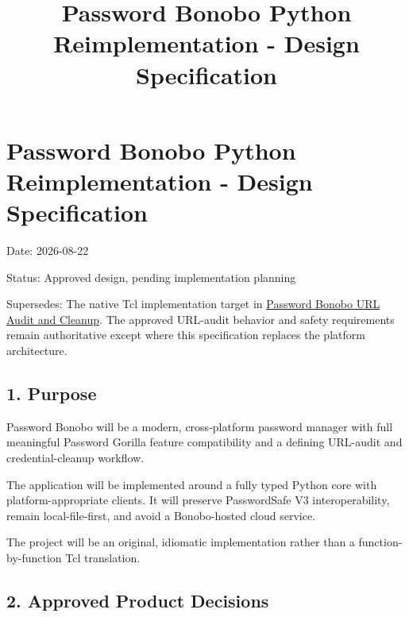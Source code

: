 \documentclass[
  letterpaper,
]{article}
\title{Password Bonobo Python Reimplementation - Design Specification}
\author{}
\date{}
\begin{document}
\maketitle

{
\setcounter{tocdepth}{3}
\tableofcontents
}
\section{Password Bonobo Python Reimplementation - Design
Specification}\label{password-bonobo-python-reimplementation---design-specification}

Date: 2026-08-22

Status: Approved design, pending implementation planning

Supersedes: The native Tcl implementation target in \href{./password-bonobo-url-audit-design.md}{Password Bonobo URL
Audit and Cleanup}. The approved URL-audit behavior and safety requirements remain authoritative except where this
specification replaces the platform architecture.

\subsection{1. Purpose}\label{1-purpose}

Password Bonobo will be a modern, cross-platform password manager with full meaningful Password Gorilla feature
compatibility and a defining URL-audit and credential-cleanup workflow.

The application will be implemented around a fully typed Python core with platform-appropriate clients. It will preserve
PasswordSafe V3 interoperability, remain local-file-first, and avoid a Bonobo-hosted cloud service.

The project will be an original, idiomatic implementation rather than a function-by-function Tcl translation.

\subsection{2. Approved Product Decisions}\label{2-approved-product-decisions}
\end{document}
